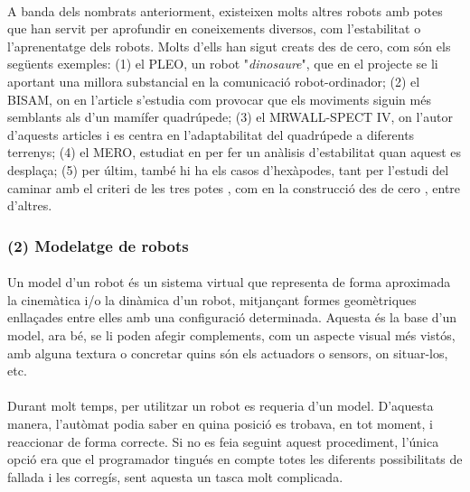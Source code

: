 \documentclass[12pt,a4paper,final,twoside]{article}
\begin{document}
\paragraph{}A banda dels nombrats anteriorment, existeixen molts altres robots amb potes que han servit per aprofundir en coneixements diversos, com l'estabilitat o l'aprenentatge dels robots. Molts d'ells han sigut creats des de cero, com són els següents exemples: (1) el PLEO, un robot "\textit{dinosaure}", que en el projecte \cite{Menendez2011} se li aportant una millora substancial en la comunicació robot-ordinador; (2) el BISAM, on en l'article \cite{Albiez2003} s'estudia com provocar que els moviments siguin més semblants als d'un mamífer quadrúpede; (3) el MRWALL-SPECT IV, on l'autor d'aquests articles \cite{Loc2010} i \cite{Loc2011} es centra en l'adaptabilitat del quadrúpede a diferents terrenys; (4) el MERO, estudiat en \cite{Ion} per fer un anàlisis d'estabilitat quan aquest es desplaça; (5) per últim, també hi ha els casos d'hexàpodes, tant per l'estudi del caminar amb el criteri de les tres potes \cite{Lee1988}, com en la construcció des de cero \cite{Lojo2009}, entre d'altres. 

\label{Modelatge de robots}
\subsubsection*{(2) Modelatge de robots}

\paragraph{}Un model d'un robot és un sistema virtual que representa de forma aproximada la cinemàtica i/o la dinàmica d'un robot, mitjançant formes geomètriques enllaçades entre elles amb una configuració determinada. Aquesta és la base d'un model, ara bé, se li poden afegir complements, com un aspecte visual més vistós, amb alguna textura o concretar quins són els actuadors o sensors, on situar-los, etc.

\paragraph{}Durant molt temps, per utilitzar un robot es requeria d'un model. D'aquesta manera, l'autòmat podia saber en quina posició es trobava, en tot moment, i reaccionar de forma correcte. Si no es feia seguint aquest procediment, l'única opció era que el programador tingués en compte totes les diferents possibilitats de fallada i les corregís, sent aquesta un tasca molt complicada.  
\end{document}
